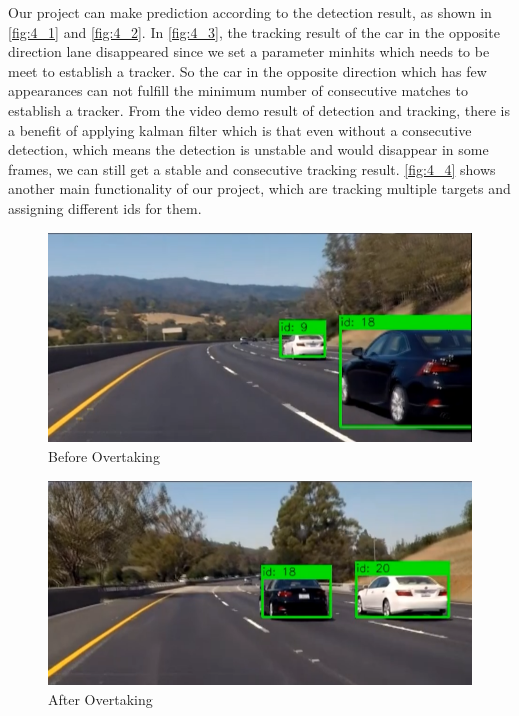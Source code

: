\documentclass[10pt,twocolumn,letterpaper]{article}
\begin{document}
Our project can make prediction according to the detection result, as shown in \ref{fig:4_1} and \ref{fig:4_2}. In \ref{fig:4_3}, the tracking result of the car in the opposite direction lane disappeared since we set a parameter minhits which needs to be meet to establish a tracker. So the car in the opposite direction which has few appearances can not fulfill the minimum number of consecutive matches to establish a tracker. From the video demo result of detection and tracking, there is a benefit of applying kalman filter which is that even without a consecutive detection, which means the detection is unstable and would disappear in some frames, we can still get a stable and consecutive tracking result. \ref{fig:4_4} shows another main functionality of our project, which are tracking multiple targets and assigning different ids for them. 

\begin{figure}[t]
\begin{center}
   \includegraphics[width=1\linewidth]{overtake1.PNG}
\end{center}
   \caption{Before Overtaking}
\label{fig:4_5}
\end{figure}

\begin{figure}[t]
\begin{center}
   \includegraphics[width=1\linewidth]{overtake2.PNG}
\end{center}
   \caption{After Overtaking}
\label{fig:4_6}
\end{figure}
\end{document}
